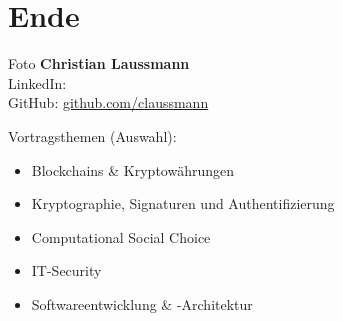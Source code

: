 
\section{Ende}

\begin{frame}{}
		Foto
		\textbf{Christian Laussmann}\\
		LinkedIn:\\
		GitHub: \href{https://github.com/claussmann}{\textcolor{secondarycolor}{github.com/claussmann}}
		
		\vspace{1cm}
		Vortragsthemen (Auswahl):
		\begin{itemize}
				\item Blockchains \& Kryptowährungen
				\item Kryptographie, Signaturen und Authentifizierung
				\item Computational Social Choice
				\item IT-Security
				\item Softwareentwicklung \& -Architektur
		\end{itemize}
\end{frame}
